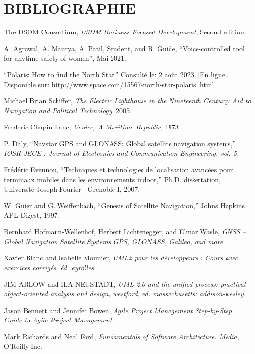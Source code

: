 \chapter*{BIBLIOGRAPHIE}
\justifying
\large
\setlength{\parindent}{2.5em}

\noindent [1] The DSDM Consortium, \textit{DSDM Business Focused Development}, Second edition.

\noindent [2] A. Agrawal, A. Maurya, A. Patil, Student, and R. Guide, “Voice-controlled tool for
anytime safety of women”, Mai 2021.

\noindent [3] “Polaris: How to find the North Star.” Consulté le: 2 août 2023. [En ligne]. Disponible sur: http://www.space.com/15567-north-star-polaris. html

\noindent [4] Michael Brian Schiffer, \textit{The Electric Lighthouse in the Nineteenth Century: Aid to	Navigation and Political Technology}, 2005.

\noindent [5] Frederic Chapin Lane, \textit{Venice, A Maritime Republic}, 1973.

\noindent [6] P. Daly, “Navstar GPS and GLONASS: Global satellite navigation systems,” \textit{IOSR
	JECE : Journal of Electronics and Communication Engineering, vol. 5.}

\noindent [7] Frédéric Evennou, “Techniques et technologies de localisation avancées pour terminaux mobiles dans les environnements indoor,” Ph.D. dissertation, Université
Joseph-Fourier - Grenoble I, 2007.

\noindent [8] W. Guier and G. Weiffenbach, “Genesis of Satellite Navigation,” Johns Hopkins APL
Digest, 1997.

\noindent [9] Bernhard Hofmann-Wellenhof, Herbert Lichtenegger, and Elmar Wasle, \textit{GNSS – Global Navigation Satellite Systems GPS, GLONASS, Galileo, and more.}

\noindent [10] Xavier Blanc and Isabelle Mounier, \textit{UML2 pour les développeurs : Cours avec exercices corrigés, éd. eyrolles}

\noindent [11] JIM ARLOW and ILA NEUSTADT, \textit{UML 2.0 and the unified process: practical
	object-oriented analysis and design, westford, ed. massachusetts: addison-wesley.}

\noindent [12] Jason Bennett and Jennifer Bowen, \textit{Agile Project Management Step-by-Step Guide to Agile Project Management.}

\noindent [13] Mark Richards and Neal Ford, \textit{Fundamentals of Software Architecture. Media}, O’Reilly Inc.

